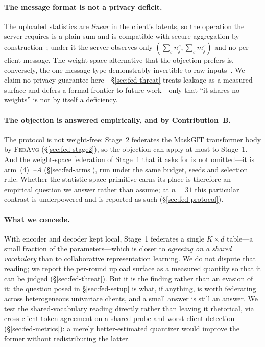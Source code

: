\paragraph{The message format is not a privacy deficit.}
The uploaded statistics are \emph{linear} in the client's latents, so the operation the
server requires is a plain sum and is compatible with secure aggregation by
construction~\cite{bonawitz2017secure}; under it the server observes only
$(\sum_s n^{s}_{j}, \sum_s m^{s}_{j})$ and no per-client message. The weight-space
alternative that the objection prefers is, conversely, the one message type demonstrably
invertible to raw inputs~\cite{zhu2019dlg,geiping2020inverting}. We claim no privacy
guarantee here---\S\ref{sec:fed-threat} treats leakage as a measured surface and defers a
formal frontier to future work---only that ``it shares no weights'' is not by itself a
deficiency.

\paragraph{The objection is answered empirically, and by Contribution~B.}
The protocol is not weight-free: Stage~2 federates the MaskGIT transformer body by
\textsc{FedAvg} (\S\ref{sec:fed-stage2}), so the objection can apply at most to Stage~1.
And the weight-space federation of Stage~1 that it asks for is not omitted---it is
arm~(4)~\emph{--A} (\S\ref{sec:fed-arms}), run under the same budget, seeds and selection
rule. Whether the statistic-space primitive earns its place is therefore an empirical
question we answer rather than assume; at $n{=}31$ this particular contrast is underpowered
and is reported as such (\S\ref{sec:fed-protocol}).

\paragraph{What we concede.}
With encoder and decoder kept local, Stage~1 federates a single $K\times d$ table---a small
fraction of the parameters---which is closer to \emph{agreeing on a shared vocabulary} than
to collaborative representation learning. We do not dispute that reading; we report the
per-round upload surface as a measured quantity so that it can be judged
(\S\ref{sec:fed-threat}). But it is the finding rather than an evasion of it: the question
posed in \S\ref{sec:fed-setup} is what, if anything, is worth federating across
heterogeneous univariate clients, and a small answer is still an answer. We test the
shared-vocabulary reading directly rather than leaving it rhetorical, via cross-client
token agreement on a shared probe and worst-client detection
(\S\ref{sec:fed-metrics}): a merely better-estimated quantizer would improve the former
without redistributing the latter.

